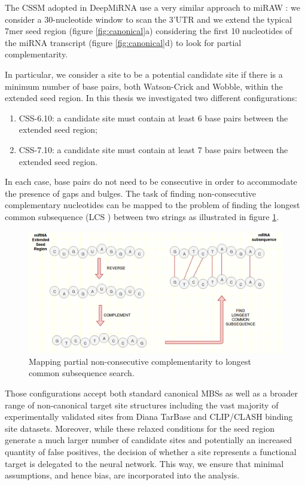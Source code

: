 The CSSM adopted in DeepMiRNA use a very similar approach to miRAW \cite{miraw}: we consider a 30-nucleotide window to scan the 3'UTR and we extend the typical 7mer seed region (figure \ref{fig:canonical}a) considering the first 10 nucleotides of the miRNA transcript (figure \ref{fig:canonical}d) to look for partial complementarity.

In particular, we consider a site to be a potential candidate site if there is a minimum number of base pairs, both Watson-Crick and Wobble, within the extended seed region. In this thesis we investigated two different configurations: 

\begin{enumerate}
	\item CSS-6.10: a candidate site must contain at least 6 base pairs between the extended seed region;
	\item CSS-7.10: a candidate site must contain at least 7 base pairs between the extended seed region.
\end{enumerate}

In each case, base pairs do not need to be consecutive in order to accommodate the presence of gaps and bulges. The task of finding non-consecutive complementary nucleotides can be mapped to the problem of finding the longest common subsequence (LCS ) between two strings as illustrated in figure \ref{fig:lcs}.

\begin{figure}[hbt!]
	\centering
	\includegraphics[width=1\textwidth]{Figures/lcs}
	\caption{Mapping partial non-consecutive complementarity to longest common subsequence search.}
	\label{fig:lcs}
\end{figure}

Those configurations accept both standard canonical MBSs as well as a broader
range of non-canonical target site structures including the vast majority of experimentally validated sites from Diana TarBase and CLIP/CLASH binding site
datasets. Moreover, while these relaxed conditions for the seed region generate a much larger number of candidate sites and potentially an increased quantity of false positives, the decision of whether a site represents a functional target is delegated to the neural network. This way, we ensure that minimal assumptions, and hence bias, are incorporated into the analysis. 

